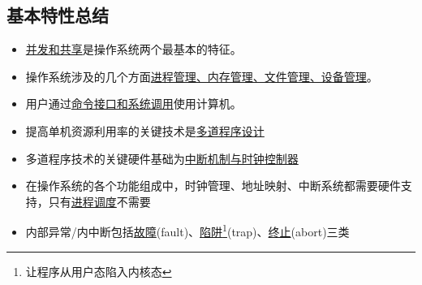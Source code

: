 \subsection{基本特性总结}
\begin{itemize}
\item \underline{并发和共享}是操作系统两个最基本的特征。
\item 操作系统涉及的几个方面\underline{进程管理、内存管理、文件管理、设备管理}。
\item 用户通过\underline{命令接口和系统调用}使用计算机。
\item 提高单机资源利用率的关键技术是\underline{多道程序设计}
\item 多道程序技术的关键硬件基础为\underline{中断机制与时钟控制器}
\item 在操作系统的各个功能组成中，时钟管理、地址映射、中断系统都需要硬件支持，只有\underline{进程调度}不需要
\item 内部异常/内中断包括\underline{故障}(fault)、\underline{陷阱}\footnote{让程序从用户态陷入内核态}(trap)、\underline{终止}(abort)三类
\end{itemize}